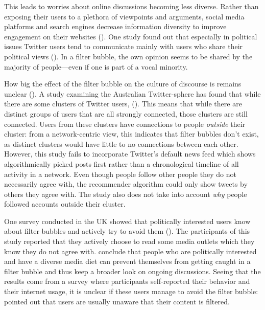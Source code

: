 This leads to worries about online discussions becoming less diverse. Rather than exposing their users to a plethora of viewpoints and arguments, social media platforms and search engines decrease information diversity to improve engagement on their websites (\cite{bozdagBreakingFilterBubble2015}). One study found out that especially in political issues Twitter users tend to communicate mainly with users who share their political views (\cite{barberaTweetingLeftRight2015}). In a filter bubble, the own opinion seems to be shared by the majority of people---even if one is part of a vocal minority.

How big the effect of the filter bubble on the culture of discourse is remains unclear (\cite{brunsEchoChamberWhat2017}). A study examining the Australian Twitter-sphere has found that while there are some clusters of Twitter users,  (\cite[9]{brunsEchoChamberWhat2017}). This means that while there are distinct groups of users that are all strongly connected, those clusters are still connected. Users from these clusters have connections to people \emph{outside} their cluster: from a network-centric view, this indicates that filter bubbles don't exist, as distinct clusters would have little to no connections between each other. However, this study fails to incorporate Twitter's default news feed which shows algorithmically picked posts first rather than a chronological timeline of all activity in a network. Even though people follow other people they do not necessarily agree with, the recommender algorithm could only show tweets by others they agree with. The study also does not take into account \emph{why} people followed accounts outside their cluster. 

One survey conducted in the UK showed that politically interested users know about filter bubbles and actively try to avoid them (\cite{duboisEchoChamberOverstated2018}). The participants of this study reported that they actively choose to read some media outlets which they know they do not agree with. \citeauthor{duboisEchoChamberOverstated2018} conclude that people who are politically interested and have a diverse media diet can prevent themselves from getting caught in a filter bubble and thus keep a broader look on ongoing discussions. Seeing that the results come from a survey where participants self-reported their behavior and their internet usage, it is unclear if these users manage to avoid the filter bubble: \citeauthor{bozdagBreakingFilterBubble2015} pointed out that users are usually unaware that their content is filtered. 

